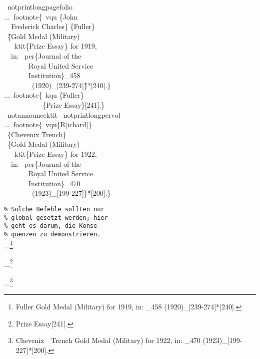 \documentclass[12pt,a4paper]{article}
\newcommand{\pbs}{\string\ \unskip}
\newcommand{\bs}{\protect\pbs}
\begin{document}
\vspace{-.25ex}
\Doppelbox
{
\bs notprintlongpagefolio
\\[1ex]
...\bs footnote\{\bs vqu \{John 
\\ \ \ Frederick Charles\} \{Fuller\} 
\\ \ \H{\{}Gold Medal (Military) 
\\ \ \ \bs ktit\{Prize Essay\} for 1919, 
\\ \ \ in: \bs per\{Journal of the
\\ \ \ \ \ \ \ \ Royal United Service 
\\ \ \ \ \ \ \ \ Institution\}\string_458 
\\ \ \ \ \ \ \ \ \ (1920)\string_[239-274]\H{\}}*[240].\}
\\[1.5ex]
...\bs footnote\{\bs kqu \{Fuller\} 
\\ \ \ \ \ \ \ \ \ \ \ \ \{Prize Essay\}[241].\}
\\[1.5ex]
\bs notannouncektit
\bs notprintlongpervol
\\[1ex]
...\bs footnote\{\bs vqu\{R[ichard]\} 
\\ \ \{Chevenix Trench\} 
\\ \ \{Gold Medal (Military) 
\\ \ \ \bs ktit\{Prize Essay\} for 1922, 
\\ \ \ in: \bs per\{Journal of the 
\\ \ \ \ \ \ \ \ Royal United Service 
\\ \ \ \ \ \ \ \ Institution\}\string_470 
\\ \ \ \ \ \ \ \ \ (1923)\string_[199-227]\}*[200].\}
}
{\notktitaddtok
\notprintlongpagefolio
\texttt{\% Solche Befehle sollten nur}\\
\texttt{\% global gesetzt werden; hier}\\
\texttt{\% geht es darum, die Konse-}\\
\texttt{\% quenzen zu demonstrieren.}
\\[6ex]
...\footnote{ {Fuller} 
{Gold Medal (Military)  for 1919, 
in: _458 (1920)_[239-274]}*[240].\label{erste}}

...\footnote{ 
{Prize Essay}[241].}

\notannouncektit
\notprintlongpervol
...\footnote{ {Chevenix\ \ Trench} 
{Gold Medal (Military)  for 1922, 
in: _470 (1923)_[199-227]}*[200].}
}
\end{document}
